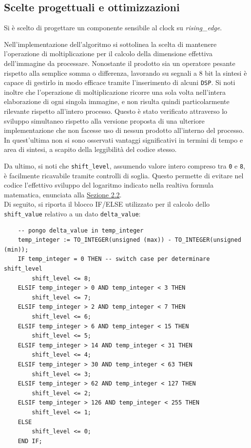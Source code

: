 \documentclass{article}
\begin{document}
\subsection{Scelte progettuali e ottimizzazioni} %
Si è scelto di progettare un componente sensibile al clock su \emph{rising\_edge}.\par
Nell’implementazione dell’algoritmo si sottolinea la scelta di mantenere l’operazione di moltiplicazione per il calcolo della dimensione effettiva dell’immagine da processare. Nonostante il prodotto sia un operatore pesante rispetto alla semplice somma o differenza, lavorando su segnali a 8 bit la sintesi è capace di gestirlo in modo efficace tramite l’inserimento di alcuni \texttt{DSP}\footnotemark.
Si noti inoltre che l’operazione di moltiplicazione ricorre una sola volta nell’intera elaborazione di ogni singola immagine, e non risulta quindi particolarmente rilevante rispetto all’intero processo. Questo è stato verificato attraverso lo sviluppo simultaneo rispetto alla versione proposta di una ulteriore implementazione che non facesse uso di nessun prodotto all’interno del processo. In quest’ultima non si sono osservati vantaggi significativi in termini di tempo e area di sintesi, a scapito della leggibilità del codice stesso.\par
Da ultimo, si noti che \texttt{shift\_level}, assumendo valore intero compreso tra \texttt{0} e \texttt{8}, è facilmente ricavabile tramite controlli di soglia. Questo permette di evitare nel codice l’effettivo sviluppo del logaritmo indicato nella realtiva formula matematica, enunciata alla \hyperref[sec:appr]{Sezione 2.2}.\\
Di seguito, si riporta il blocco IF/ELSE utilizzato per il calcolo dello \texttt{shift\_value} relativo a un dato \texttt{delta\_value}:
\vspace{-.15cm}

\begin{verbatim}
    -- pongo delta_value in temp_integer
    temp_integer := TO_INTEGER(unsigned (max)) - TO_INTEGER(unsigned (min)); 
    IF temp_integer = 0 THEN -- switch case per determinare shift_level
        shift_level <= 8;
    ELSIF temp_integer > 0 AND temp_integer < 3 THEN
        shift_level <= 7;
    ELSIF temp_integer > 2 AND temp_integer < 7 THEN
        shift_level <= 6;
    ELSIF temp_integer > 6 AND temp_integer < 15 THEN
        shift_level <= 5;
    ELSIF temp_integer > 14 AND temp_integer < 31 THEN
        shift_level <= 4;
    ELSIF temp_integer > 30 AND temp_integer < 63 THEN
        shift_level <= 3;
    ELSIF temp_integer > 62 AND temp_integer < 127 THEN
        shift_level <= 2;
    ELSIF temp_integer > 126 AND temp_integer < 255 THEN
        shift_level <= 1;
    ELSE
        shift_level <= 0;
    END IF;
\end{verbatim}
\end{document}
